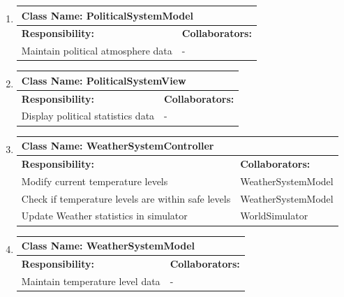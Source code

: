 \documentclass[]{article}
\begin{document}
\begin{enumerate}[1.]
\begin{tabular}{|p{10cm}|p{4cm}|}
	    \hline
	  \end{tabular}

	\item
	\begin{tabular}{|p{10cm}|p{4cm}|}
	    \hline
	     \multicolumn{2}{|l|}{\textbf{Class Name:  PoliticalSystemModel}} \\
	    \hline
	    \textbf{Responsibility:} & \textbf{Collaborators:} \\
	    \hline
	    Maintain political atmosphere data & - \\

	    \hline
	  \end{tabular}

	\item
	\begin{tabular}{|p{10cm}|p{4cm}|}
	    \hline
	     \multicolumn{2}{|l|}{\textbf{Class Name:  PoliticalSystemView}} \\
	    \hline
	    \textbf{Responsibility:} & \textbf{Collaborators:} \\
	    \hline
	    Display political statistics data & - \\

	    \hline
	  \end{tabular}

	\item
	\begin{tabular}{|p{10cm}|p{4cm}|}
	    \hline
	     \multicolumn{2}{|l|}{\textbf{Class Name:  WeatherSystemController}} \\
	    \hline
	    \textbf{Responsibility:} & \textbf{Collaborators:} \\
	    \hline
	    Modify current temperature levels & WeatherSystemModel \\
	Check if temperature levels are within safe levels & WeatherSystemModel \\
	Update Weather statistics in simulator & WorldSimulator \\

	    \hline
	  \end{tabular}

	\item
	\begin{tabular}{|p{10cm}|p{4cm}|}
	    \hline
	     \multicolumn{2}{|l|}{\textbf{Class Name:  WeatherSystemModel}} \\
	    \hline
	    \textbf{Responsibility:} & \textbf{Collaborators:} \\
	    \hline
	    Maintain temperature level data & - \\


\end{tabular}
\end{enumerate}
\end{document}
